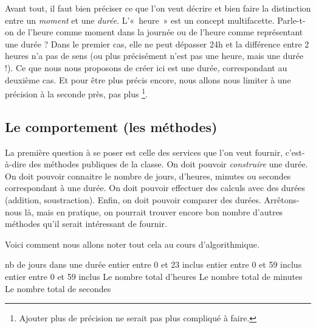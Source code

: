 		Avant tout, il faut bien préciser ce que l’on veut décrire
		et bien faire la distinction entre un \emph{moment} et une \emph{durée}.
		L’«~heure~» est un concept multifacette. 
		Parle-t-on de l’heure comme moment dans la journée 
		ou de l’heure comme représentant une durée ? 
		Dans le premier cas, elle ne peut dépasser 24h 
		et la différence entre 2 heures n’a pas de sens 
		(ou plus précisément n’est pas une heure, mais une durée !).
		Ce que nous nous proposons de créer ici est une durée,
		correspondant au deuxième cas.
		Et pour être plus précis encore,
		nous allons nous limiter à une précision à la seconde près,
		pas plus%
		\footnote{%
			Ajouter plus de précision ne serait pas plus compliqué à faire.%
		}.
	
	\subsection{Le comportement (les méthodes)}
	
		La première question à se poser est celle des services que l’on veut
		fournir, c’est-à-dire des méthodes publiques de la classe. On doit
		pouvoir \textit{construire} une durée. On doit pouvoir connaitre le
		nombre de jours, d’heures, minutes ou secondes correspondant à une durée. On doit
		pouvoir effectuer des calculs avec des durées (addition, soustraction).
		Enfin, on doit pouvoir comparer des durées. Arrêtons-nous là, mais en
		pratique, on pourrait trouver encore bon nombre d’autres méthodes qu’il
		serait intéressant de fournir. 
		
		Voici comment nous allons noter tout cela au cours d'algorithmique.
		
		\begin{LDA}
				\Public
					\Empty
					\RComment nb de jours dans une durée
					\RComment entier entre 0 et 23 inclus
					\RComment entier entre 0 et 59 inclus
					\RComment entier entre 0 et 59 inclus
					\Empty
					\RComment Le nombre total d’heures
					\RComment Le nombre total de minutes
					\RComment Le nombre total de secondes
					\Empty
			\EndClass
		\end{LDA}
		
